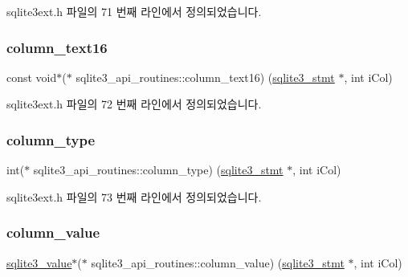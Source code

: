 sqlite3ext.\+h 파일의 71 번째 라인에서 정의되었습니다.

\mbox{\label{structsqlite3__api__routines_a952f4680bde7ff3af3ada148380ec08e}} 
\subsubsection{\texorpdfstring{column\+\_\+text16}{column\_text16}}
{\footnotesize\ttfamily const void$\ast$($\ast$ sqlite3\+\_\+api\+\_\+routines\+::column\+\_\+text16) (\hyperlink{sqlite3_8h_af2a033da1327cdd77f0a174a09aedd0c}{sqlite3\+\_\+stmt} $\ast$, int i\+Col)}



sqlite3ext.\+h 파일의 72 번째 라인에서 정의되었습니다.

\mbox{\label{structsqlite3__api__routines_a1381e48828398ae738aa2416d2e4feb9}} 
\subsubsection{\texorpdfstring{column\+\_\+type}{column\_type}}
{\footnotesize\ttfamily int($\ast$ sqlite3\+\_\+api\+\_\+routines\+::column\+\_\+type) (\hyperlink{sqlite3_8h_af2a033da1327cdd77f0a174a09aedd0c}{sqlite3\+\_\+stmt} $\ast$, int i\+Col)}



sqlite3ext.\+h 파일의 73 번째 라인에서 정의되었습니다.

\mbox{\label{structsqlite3__api__routines_a1ca935310e3637179f857791ccb42116}} 
\subsubsection{\texorpdfstring{column\+\_\+value}{column\_value}}
{\footnotesize\ttfamily \hyperlink{sqlite3_8h_ac2fa1ecdb2290d9af6010edbd1cbc83c}{sqlite3\+\_\+value}$\ast$($\ast$ sqlite3\+\_\+api\+\_\+routines\+::column\+\_\+value) (\hyperlink{sqlite3_8h_af2a033da1327cdd77f0a174a09aedd0c}{sqlite3\+\_\+stmt} $\ast$, int i\+Col)}



